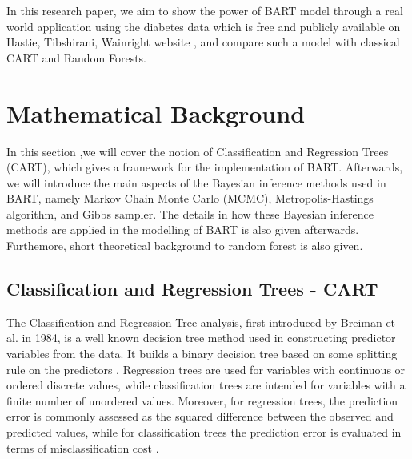 \documentclass{usiinftr}
\begin{document}
In this research paper, we aim to show the power of BART model through a real world application using the diabetes data which is free and publicly available on Hastie, Tibshirani,
Wainright website \cite{24}, and compare such a model with classical CART and Random Forests.  

\section{Mathematical Background}
In this section ,we will cover the notion of Classification and Regression Trees (CART), which gives a framework for the implementation of BART. 
Afterwards, we will introduce the main aspects of the Bayesian inference methods used in BART, namely Markov Chain Monte Carlo (MCMC), Metropolis-Hastings algorithm, and Gibbs sampler. The details in how these Bayesian inference methods are applied in the modelling of BART is also given afterwards. Furthemore, short theoretical background to random forest is also given.

\subsection{Classification and Regression Trees - CART}
The Classification and Regression Tree analysis, first introduced by Breiman et al. in 1984, is a well known decision tree method used in constructing predictor variables from the data. It builds a binary decision tree based on some splitting rule on the predictors \cite{1}. Regression trees are used for variables with continuous or ordered discrete values, while classification trees are intended for variables with a finite number of unordered values. Moreover, for regression trees, the prediction error is commonly assessed as the squared difference between the observed and predicted values, while for classification trees the prediction error is evaluated in terms of misclassification cost \cite{2}.
\end{document}
